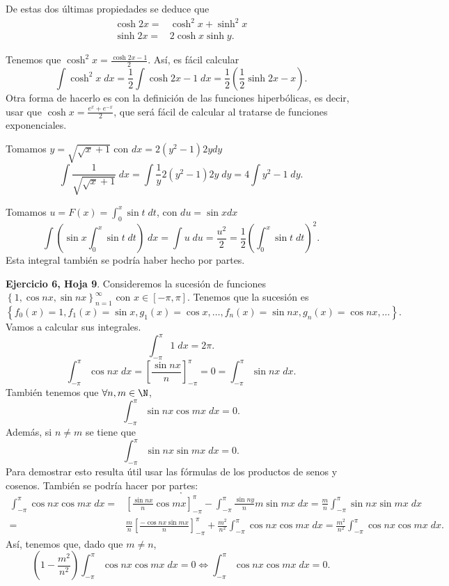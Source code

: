 De estas dos últimas propiedades se deduce que
\[
\begin{split}
	\cosh 2x =& \cosh ^{2}x + \sinh^{2}x \\
	\sinh2x = & 2 \cosh x \sinh y.
\end{split}
\]
\begin{eg}
\normalfont Tenemos que $\displaystyle \cosh^{2}x = \frac{\cosh2x -1}{2} $. Así, es fácil calcular
\[\int \cosh^{2}x \; dx = \frac{1}{2}\int \cosh 2x - 1 \; dx = \frac{1}{2}\left(\frac{1}{2}\sinh2x - x\right).\]
Otra forma de hacerlo es con la definición de las funciones hiperbólicas, es decir, usar que $\displaystyle \cosh x = \frac{e^{x}+e^{-x}}{2} $, que será fácil de calcular al tratarse de funciones exponenciales.
\end{eg}
\begin{eg}
\normalfont Tomamos $\displaystyle y = \sqrt{\sqrt{x}+1} $ con $\displaystyle dx = 2\left(y^{2}-1\right)2ydy $ 
\[\int \frac{1}{\sqrt{\sqrt{x}+1}} \; dx = \int \frac{1}{y}2\left(y^{2}-1\right)2y \; dy = 4\int y^{2}-1 \; dy.\]
\end{eg}
\begin{eg}
\normalfont Tomamos $\displaystyle u = F\left(x\right) = \int^{x}_{0} \sin t \; dt$, con $\displaystyle du = \sin x dx $ 
\[ \int \left(\sin x \int^{x}_{0} \sin t \; dt\right) \; dx = \int u \; du = \frac{u^{2}}{2} = \frac{1}{2}\left(\int^{x}_{0} \sin t \; dt\right)^{2}.\]
Esta integral también se podría haber hecho por partes.
\end{eg}
\begin{eg}
	\normalfont \textbf{Ejercicio 6, Hoja 9}. Consideremos la sucesión de funciones $\displaystyle \left\{ 1, \cos nx, \sin n x\right\} ^{\infty}_{n=1} $ con $\displaystyle x \in \left[-\pi , \pi \right]  $. Tenemos que la sucesión es
	\[ \left\{ f_{0}\left(x\right)= 1, f_{1}\left(x\right) = \sin x, g_{1}\left(x\right) = \cos x, \ldots, f_{n}\left(x\right) = \sin n x, g_{n}\left(x\right) = \cos nx, \ldots\right\}  .\]
Vamos a calcular sus integrales. 
\[ \int^{\pi }_{-\pi } 1 \; dx =2\pi.\]
\[ \int^{\pi }_{- \pi } \cos nx \; dx = \left[\frac{\sin nx}{n}\right] ^{\pi }_{- \pi } = 0 = \int^{\pi }_{-\pi } \sin nx \; dx.\]
También tenemos que $\displaystyle \forall n,m \in \N $, 
\[ \int^{\pi }_{- \pi } \sin nx \cos mx \; dx = 0.\]
Además, si $\displaystyle n \neq m $ se tiene que
\[ \int^{ \pi }_{-\pi } \sin nx \sin mx \; dx = 0 .\]
Para demostrar esto resulta útil usar las fórmulas de los productos de senos y cosenos. También se podría hacer por partes:
\[  .\]
\[
\begin{split}
	\int^{\pi }_{- \pi } \cos nx \cos mx \; dx = & \left[\frac{\sin nx}{n}\cos mx\right]^{\pi }_{-\pi} - \int^{\pi }_{- \pi } \frac{\sin ny}{n}m\sin mx \; dx = \frac{m }{n} \int^{\pi }_{- \pi } \sin nx \sin mx  \; dx \\
	= & \frac{m}{n}\left[\frac{-\cos nx \sin mx}{n}\right]^{\pi }_{-\pi} + \frac{m^{2}}{n^{2}}\int^{\pi }_{-\pi } \cos nx \cos mx \; dx = \frac{m^{2}}{n^{2}}\int^{\pi }_{- \pi } \cos nx \cos mx \; dx.
\end{split}
\]
Así, tenemos que, dado que $\displaystyle m \neq n $,
\[ \left(1- \frac{m^{2}}{n^{2}}\right)\int^{\pi }_{- \pi } \cos nx \cos mx  \; dx = 0 \iff \int^{\pi }_{- \pi } \cos nx \cos mx  \; dx = 0 .\]
\end{eg}

